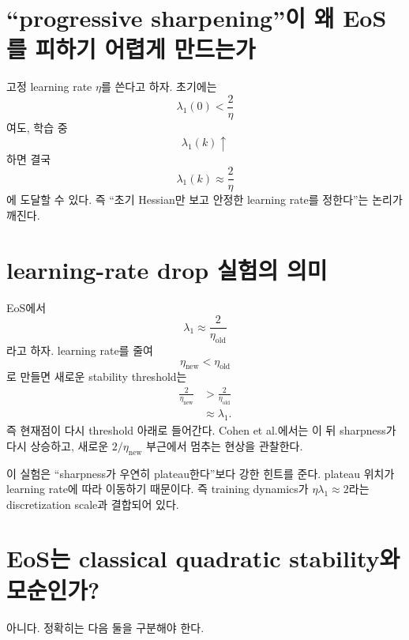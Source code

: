 \documentclass[11pt,a4paper,oneside,openany]{memoir}
\theoremstyle{definition}
\begin{document}
\section{``progressive sharpening''이 왜 EoS를 피하기 어렵게 만드는가}

고정 learning rate $\eta$를 쓴다고 하자.
초기에는
\begin{equation}
  \lambda_1(0)<\frac{2}{\eta}
\end{equation}
여도, 학습 중
\begin{equation}
  \lambda_1(k)\uparrow
\end{equation}
하면 결국
\begin{equation}
  \lambda_1(k)\approx\frac{2}{\eta}
\end{equation}
에 도달할 수 있다.
즉 ``초기 Hessian만 보고 안정한 learning rate를 정한다''는 논리가 깨진다.

\section{learning-rate drop 실험의 의미}

EoS에서
\begin{equation}
  \lambda_1\approx\frac{2}{\eta_{\text{old}}}
\end{equation}
라고 하자. learning rate를 줄여
\begin{equation}
  \eta_{\text{new}}<\eta_{\text{old}}
\end{equation}
로 만들면 새로운 stability threshold는
\begin{align}
  \frac{2}{\eta_{\text{new}}}
  &>\frac{2}{\eta_{\text{old}}}\\
  &\approx\lambda_1.
\end{align}
즉 현재점이 다시 threshold 아래로 들어간다. Cohen et al.에서는 이 뒤 sharpness가 다시 상승하고,
새로운 $2/\eta_{\text{new}}$ 부근에서 멈추는 현상을 관찰한다.

\begin{keybox}
이 실험은 ``sharpness가 우연히 plateau한다''보다 강한 힌트를 준다.
plateau 위치가 learning rate에 따라 이동하기 때문이다.
즉 training dynamics가 $\eta\lambda_1\approx2$라는 discretization scale과 결합되어 있다.
\end{keybox}

\section{EoS는 classical quadratic stability와 모순인가?}

아니다. 정확히는 다음 둘을 구분해야 한다.
\end{document}
